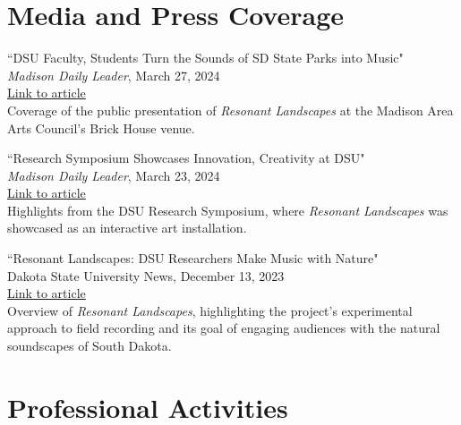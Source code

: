 \documentclass[12pt, a4paper]{article}
\newcommand{\years}[1]{\leavevmode\marginnote{\scriptsize #1}\ignorespaces}%
\begin{document}
\section*{Media and Press Coverage}

\years{2024} ``DSU Faculty, Students Turn the Sounds of SD State Parks into Music" \\
\textit{Madison Daily Leader}, March 27, 2024 \\
\href{https://www.madisondailyleader.com/news/local/article_c0bdd132-ec50-11ee-8049-a715d4e9b761.html}{Link to article} \\
Coverage of the public presentation of \textit{Resonant Landscapes} at the Madison Area Arts Council's Brick House venue.

\years{2024} ``Research Symposium Showcases Innovation, Creativity at DSU" \\
\textit{Madison Daily Leader}, March 23, 2024 \\
\href{https://www.madisondailyleader.com/news/local/article_455caa5e-e85e-11ee-8628-cf0c5c2b7152.html}{Link to article} \\
Highlights from the DSU Research Symposium, where \textit{Resonant Landscapes} was showcased as an interactive art installation.

\years{2023} ``Resonant Landscapes: DSU Researchers Make Music with Nature" \\
Dakota State University News, December 13, 2023 \\
\href{https://dsu.edu/news/2023/12/resonant-landscapes.html}{Link to article} \\
Overview of \textit{Resonant Landscapes}, highlighting the project's experimental approach to field recording and its goal of engaging audiences with the natural soundscapes of South Dakota.

\section*{Professional Activities}
\end{document}
